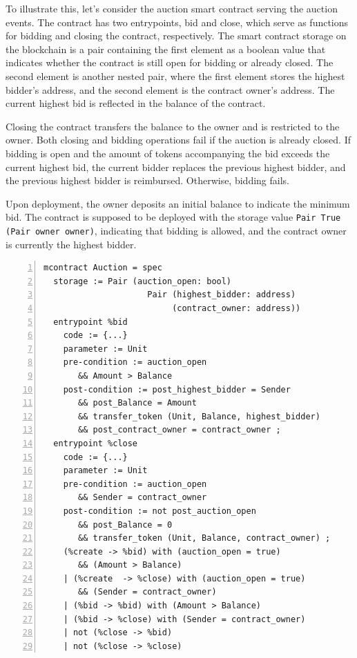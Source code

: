 \documentclass[a4paper,UKenglish,cleveref, autoref, thm-restate]{lipics-v2021}
\begin{document}
To illustrate this, let's consider the  auction smart contract serving the auction events. The contract has two entrypoints, bid and close, which serve as functions for bidding and closing the contract, respectively. The smart contract storage on the blockchain is a pair containing the first element as a boolean value that indicates whether the contract is still open for bidding or already closed. The second element is another nested pair, where the first element  stores the highest bidder's address, and the second element is the contract owner's address. The current highest bid is reflected in the balance of the contract.

Closing the contract transfers the balance to the owner and is restricted to the owner. Both closing and bidding operations fail if the auction is already closed. If bidding is open and the amount of tokens accompanying the bid exceeds the current highest bid, the current bidder replaces the previous highest bidder, and the previous highest bidder is reimbursed. Otherwise, bidding fails.

Upon deployment, the owner deposits an initial balance to indicate the minimum bid. The contract is supposed to be deployed with the storage value  \lstinline/Pair True (Pair owner owner)/, indicating that bidding is allowed, and the contract owner is currently the highest bidder.

\begin{lstlisting}[float,captionpos=b,caption={Auction contract specification},label={lst:auction-contract-specification},numbers=left]
mcontract Auction = spec 
  storage := Pair (auction_open: bool) 
                     Pair (highest_bidder: address)
                          (contract_owner: address))
  entrypoint %bid
    code := {...}
    parameter := Unit 
    pre-condition := auction_open 
       && Amount > Balance
    post-condition := post_highest_bidder = Sender 
       && post_Balance = Amount 
       && transfer_token (Unit, Balance, highest_bidder) 
       && post_contract_owner = contract_owner ;
  entrypoint %close
    code := {...}
    parameter := Unit
    pre-condition := auction_open 
       && Sender = contract_owner                
    post-condition := not post_auction_open 
       && post_Balance = 0 
       && transfer_token (Unit, Balance, contract_owner) ;
    (%create -> %bid) with (auction_open = true)  
       && (Amount > Balance) 
    | (%create  -> %close) with (auction_open = true) 
       && (Sender = contract_owner)
    | (%bid -> %bid) with (Amount > Balance)  
    | (%bid -> %close) with (Sender = contract_owner)  
    | not (%close -> %bid) 
    | not (%close -> %close)
\end{lstlisting}
\end{document}
